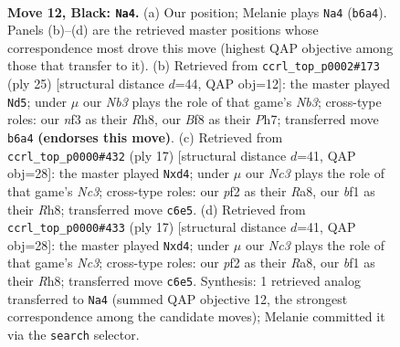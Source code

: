 \documentclass[11pt]{article}
\begin{document}
\clearpage

\begin{figure}[p]\centering
\begin{subfigure}{0.46\textwidth}\centering
\resizebox{\linewidth}{!}{%
\newchessgame
\chessboard[
  setfen={r1b1kb1r/1p3ppp/pnn1p3/4P3/8/4BNP1/PP3P1P/RN1K1B1R b kq - 1 12},
  showmover=false,
  pgfstyle=straightmove, color=movearrow, markmove={b6-a4}
]}
\caption{}
\end{subfigure}\hfill
\begin{subfigure}{0.46\textwidth}\centering
\resizebox{\linewidth}{!}{%
\newchessgame
\chessboard[
  setfen={r1b4r/pp2kppp/1n2p3/PBb5/8/2P2N2/1P2KPPP/R1B4R b - - 0 13},
  showmover=false,
  pgfstyle=straightmove, color=movearrow, markmove={b6-d5}
]}
\caption{}
\end{subfigure}
\\[4pt]
\begin{subfigure}{0.46\textwidth}\centering
\resizebox{\linewidth}{!}{%
\newchessgame
\chessboard[
  setfen={r1b1k1nr/ppp1b1pp/2np4/8/2BP1B2/2N5/PPP3PP/R3K1NR b KQkq - 2 9},
  showmover=false,
  pgfstyle=straightmove, color=movearrow, markmove={c6-d4}
]}
\caption{}
\end{subfigure}\hfill
\begin{subfigure}{0.46\textwidth}\centering
\resizebox{\linewidth}{!}{%
\newchessgame
\chessboard[
  setfen={r1b1k1nr/ppp1b1pp/2np4/8/2BP1B2/2N5/PPP3PP/R3K1NR b KQkq - 2 9},
  showmover=false,
  pgfstyle=straightmove, color=movearrow, markmove={c6-d4}
]}
\caption{}
\end{subfigure}
\caption{\textbf{Move 12, Black: \texttt{Na4}.} (a) Our position; Melanie plays \texttt{Na4} (\texttt{b6a4}). Panels (b)--(d) are the retrieved master positions whose correspondence most drove this move (highest QAP objective among those that transfer to it). (b) Retrieved from \texttt{ccrl\_top\_p0002\#173} (ply 25) [structural distance $d$=44, QAP obj=12]: the master played \texttt{Nd5}; under $\mu$ our \emph{Nb3} plays the role of that game's \emph{Nb3}; cross-type roles: our \emph{n}f3 as their \emph{R}h8, our \emph{B}f8 as their \emph{P}h7; transferred move \texttt{b6a4} \textbf{(endorses this move)}. (c) Retrieved from \texttt{ccrl\_top\_p0000\#432} (ply 17) [structural distance $d$=41, QAP obj=28]: the master played \texttt{Nxd4}; under $\mu$ our \emph{Nc3} plays the role of that game's \emph{Nc3}; cross-type roles: our \emph{p}f2 as their \emph{R}a8, our \emph{b}f1 as their \emph{R}h8; transferred move \texttt{c6e5}. (d) Retrieved from \texttt{ccrl\_top\_p0000\#433} (ply 17) [structural distance $d$=41, QAP obj=28]: the master played \texttt{Nxd4}; under $\mu$ our \emph{Nc3} plays the role of that game's \emph{Nc3}; cross-type roles: our \emph{p}f2 as their \emph{R}a8, our \emph{b}f1 as their \emph{R}h8; transferred move \texttt{c6e5}. Synthesis: 1 retrieved analog transferred to \texttt{Na4} (summed QAP objective 12, the strongest correspondence among the candidate moves); Melanie committed it via the \texttt{search} selector.}
\label{fig:thought-m23}
\end{figure}
\end{document}
